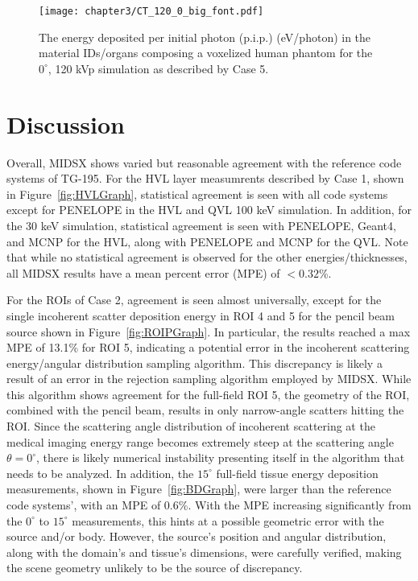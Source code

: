 \begin{figure}[H]
    \centering
	\texttt{[image: chapter3/CT\_120\_0\_big\_font.pdf]}
	\caption{The energy deposited per initial photon (p.i.p.) (eV/photon) in the material IDs/organs composing a voxelized human phantom for the $0^\circ$, 120 kVp simulation as described by Case 5.}
	\label{fig:CTGraph}
\end{figure}

\section{Discussion}
\par Overall, MIDSX shows varied but reasonable agreement with the reference code systems of TG-195. For the HVL layer measumrents described by Case 1, shown in Figure~\ref{fig:HVLGraph}, statistical agreement is seen with all code systems except for PENELOPE in the HVL and QVL 100 keV simulation. In addition, for the 30 keV simulation, statistical agreement is seen with PENELOPE, Geant4, and MCNP for the HVL, along with PENELOPE and MCNP for the QVL. Note that while no statistical agreement is observed for the other energies/thicknesses, all MIDSX results have a mean percent error (MPE) of $<0.32$\%.

\par For the ROIs of Case 2, agreement is seen almost universally, except for the single incoherent scatter deposition energy in ROI 4 and 5 for the pencil beam source shown in Figure~\ref{fig:ROIPGraph}. In particular, the results reached a max MPE of 13.1\% for ROI 5, indicating a potential error in the incoherent scattering energy/angular distribution sampling algorithm. This discrepancy is likely a result of an error in the rejection sampling algorithm employed by MIDSX. While this algorithm shows agreement for the full-field ROI 5, the geometry of the ROI, combined with the pencil beam, results in only narrow-angle scatters hitting the ROI. Since the scattering angle distribution of incoherent scattering at the medical imaging energy range becomes extremely steep at the scattering angle $\theta = 0^\circ$, there is likely numerical instability presenting itself in the algorithm that needs to be analyzed. In addition, the $15^\circ$ full-field tissue energy deposition measurements, shown in Figure~\ref{fig:BDGraph}, were larger than the reference code systems', with an MPE of 0.6\%. With the MPE increasing significantly from the $0^\circ$ to $15^\circ$ measurements, this hints at a possible geometric error with the source and/or body. However, the source's position and angular distribution, along with the domain's and tissue's dimensions, were carefully verified, making the scene geometry unlikely to be the source of discrepancy.

